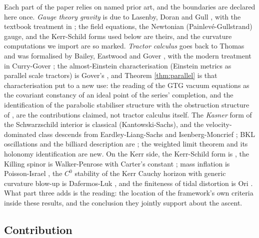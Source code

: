 \documentclass[11pt]{article}
\theoremstyle{definition}
\begin{document}
Each part of the paper relies on named prior art, and the boundaries are declared here once. \emph{Gauge theory gravity} is due to Lasenby, Doran and Gull \cite{LDG1998}, with the textbook treatment in \cite{DoranLasenby2003}; the field equations, the Newtonian (Painlev\'e-Gullstrand) gauge, and the Kerr-Schild forms used below are theirs, and the curvature computations we import are so marked. \emph{Tractor calculus} goes back to Thomas and was formalised by Bailey, Eastwood and Gover \cite{BEG1994}, with the modern treatment in Curry-Gover \cite{CurryGover2018}; the almost-Einstein characterisation (Einstein metrics as parallel scale tractors) is Gover's \cite{Gover2010}, and Theorem \ref{thm:parallel} is that characterisation put to a new use: the reading of the GTG vacuum equations as the covariant constancy of an ideal point of the series' completion, and the identification of the parabolic stabiliser structure with the obstruction structure of \cite{ButlerT1}, are the contributions claimed, not tractor calculus itself. The \emph{Kasner} form of the Schwarzschild interior is classical (Kantowski-Sachs), and the velocity-dominated class descends from Eardley-Liang-Sachs \cite{ELS1972} and Isenberg-Moncrief \cite{IsenbergMoncrief1990}; BKL oscillations and the billiard description are \cite{BKL1970, DHN2003}; the weighted limit theorem and its holonomy identification are new. On the Kerr side, the Kerr-Schild form is \cite{KerrSchild1965}, the Killing spinor is Walker-Penrose \cite{WalkerPenrose1970} with Carter's constant \cite{Carter1968}; mass inflation is Poisson-Israel \cite{PoissonIsrael1990}, the $C^0$ stability of the Kerr Cauchy horizon with generic curvature blow-up is Dafermos-Luk \cite{DafermosLuk2017}, and the finiteness of tidal distortion is Ori \cite{Ori1991}. What part three adds is the reading: the location of the framework's own criteria inside these results, and the conclusion they jointly support about the ascent.

\subsection*{Contribution}
\end{document}
